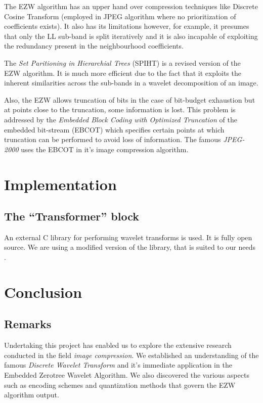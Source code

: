 \documentclass[a4paper,12pt]{report}
\begin{document}
\par

The EZW algorithm has an upper hand over compression techniques like Discrete
Cosine Transform (employed in JPEG algorithm where no prioritization of
coefficients exists). It also has its limitations however, for example, it
presumes that only the LL sub-band is split iteratively and it is also
incapable of exploiting the redundancy present in the neighbourhood
coefficients.

The \textit{Set Paritioning in Hierarchial Trees} (SPIHT) is a revised version
of the EZW algorithm. It is much more efficient due to the fact that it
exploits the inherent similarities across the sub-bands in a wavelet
decomposition of an image. \cite{sayood_datac}

\par

Also, the EZW allows truncation of bits in the case of bit-budget exhaustion
but at points close to the truncation, some information is lost. This problem
is addressed by the \textit{Embedded Block Coding with Optimized Truncation} of
the embedded bit-stream (EBCOT) which specifies certain points at which
truncation can be performed to avoid loss of information. The famous
\textit{JPEG-2000} uses the EBCOT in it's image compression algorithm. \cite{sayood_datac}

\chapter{Implementation}

\section{The ``Transformer'' block}

An external C library for performing wavelet transforms is used. It is fully
open source. We are using a modified version of the library, that is suited to
our needs \cite{rpwavelib}.


\chapter{Conclusion}
\section{Remarks}
Undertaking this project has enabled us to explore the extensive research
conducted in the field \textit{image compression}. We established an
understanding of the famous \textit{Discrete Wavelet Transform} and it's
immediate application in the Embedded Zerotree Wavelet Algorithm. We also
discovered the various aspects such as encoding schemes and quantization
methods that govern the EZW algorithm output.
\end{document}
